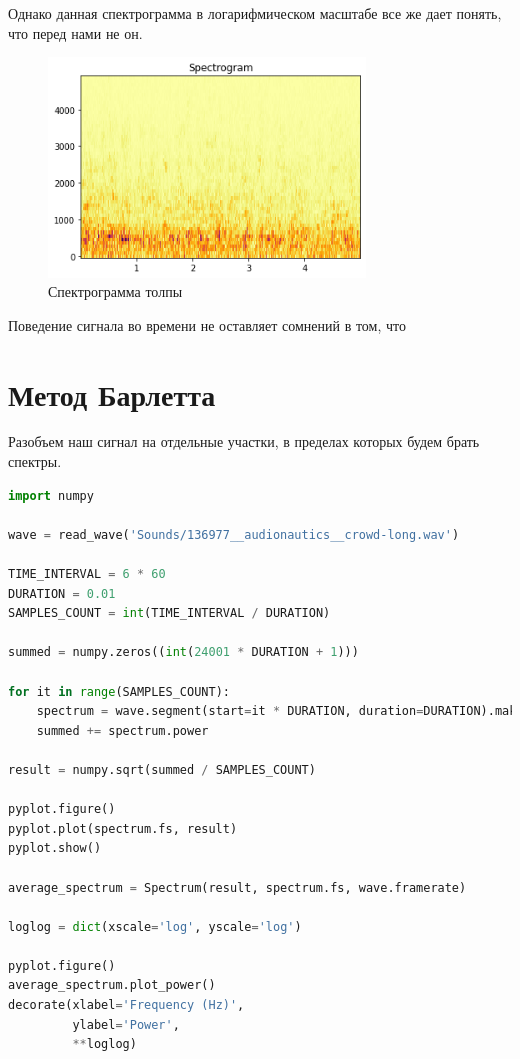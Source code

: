 \documentclass[a4paper,12pt]{report}
\begin{document}
    Однако данная спектрограмма в логарифмическом масштабе все же дает понять, что перед нами не он.
    
    \begin{figure}[H]
        \centering
        \includegraphics[width=0.75\textwidth]{ex1_crowd_spectrogram.png}
        \caption{Спектрограмма толпы}
        \label{fig:ex1_crowd_spectrogram}
    \end{figure}
    
    Поведение сигнала во времени не оставляет сомнений в том, что 
    
    \chapter{Метод Барлетта}

    Разобъем наш сигнал на отдельные участки, в пределах которых будем брать спектры. 

\begin{lstlisting}[language=Python,caption=Барлетт]
import numpy

wave = read_wave('Sounds/136977__audionautics__crowd-long.wav')

TIME_INTERVAL = 6 * 60
DURATION = 0.01
SAMPLES_COUNT = int(TIME_INTERVAL / DURATION)

summed = numpy.zeros((int(24001 * DURATION + 1)))

for it in range(SAMPLES_COUNT):
    spectrum = wave.segment(start=it * DURATION, duration=DURATION).make_spectrum()
    summed += spectrum.power
    
result = numpy.sqrt(summed / SAMPLES_COUNT)

pyplot.figure()
pyplot.plot(spectrum.fs, result)
pyplot.show()

average_spectrum = Spectrum(result, spectrum.fs, wave.framerate)

loglog = dict(xscale='log', yscale='log')

pyplot.figure()
average_spectrum.plot_power()
decorate(xlabel='Frequency (Hz)', 
         ylabel='Power', 
         **loglog)
\end{lstlisting}
    
\end{document}
